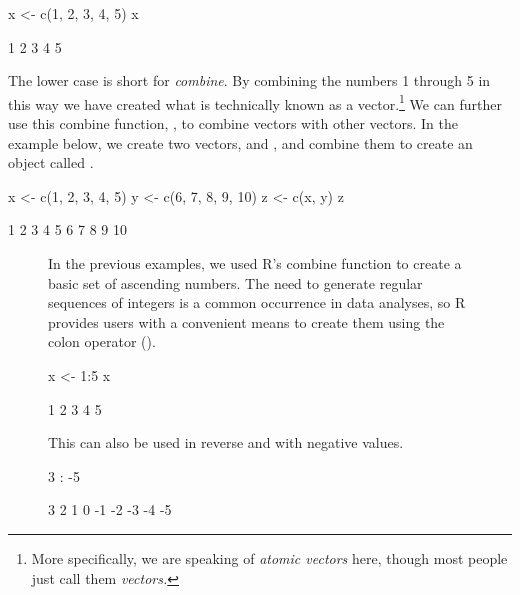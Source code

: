 \begin{inR}
x <- c(1, 2, 3, 4, 5)
x
\end{inR}

\begin{outR}
[1] 1 2 3 4 5
\end{outR}

The lower case  is short for \textit{combine}. By combining the numbers 1 through 5 in this way we have created what is technically known as a \gls{vector}.\footnote{More specifically, we are speaking of \textit{atomic vectors} here, though most people just call them \textit{vectors.}} We can further use this combine function, , to combine vectors with other vectors. In the example below, we create two vectors,  and , and combine them to create an object called .

\begin{inR}
x <- c(1, 2, 3, 4, 5)
y <- c(6, 7, 8, 9, 10)
z <- c(x, y)
z
\end{inR}
\begin{outR}
[1]  1  2  3  4  5  6  7  8  9 10
\end{outR}

\begin{figure}[!b]
    \centering
\begin{mdframed}[style = miscFrame, frametitle = Box 1.2: How to Use Your Colon Effectively \R{:}]

In the previous examples, we used R's combine function to create a basic set of ascending numbers. The need to generate regular sequences of integers is a common occurrence in data analyses, so R provides users with a convenient means to create them using the \gls{colon operator} (\R{:}).

\begin{inR}
x <- 1:5
x
\end{inR}
\vspace{1cm}
\begin{outR}
[1] 1 2 3 4 5
\end{outR} 

\vspace{\baselineskip}

This can also be used in reverse and with negative values.

\begin{inR}
3 : -5
\end{inR}
\vspace{1cm}
\begin{outR}
[1] 3  2  1  0 -1 -2 -3 -4 -5
\end{outR}

\end{mdframed}
\end{figure}

